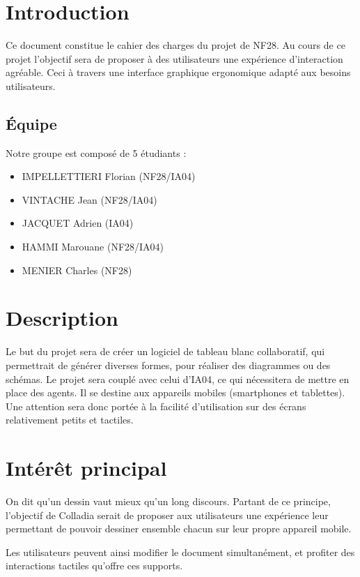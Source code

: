 \documentclass[a4paper,11pt]{article}
\begin{document}


\newpage
\section{Introduction}
Ce document constitue le cahier des charges du projet de NF28. Au cours de ce projet l'objectif sera de proposer à des utilisateurs une expérience d'interaction agréable. Ceci à travers une interface graphique ergonomique adapté aux besoins utilisateurs.

\subsection{Équipe}
Notre groupe est composé de 5 étudiants :
\begin{itemize}
\item IMPELLETTIERI Florian (NF28/IA04)
\item VINTACHE Jean (NF28/IA04)
\item JACQUET Adrien (IA04)
\item HAMMI Marouane (NF28/IA04)
\item MENIER Charles (NF28)
\end{itemize}



\section{Description}
Le but du projet sera de créer un logiciel de tableau blanc collaboratif, qui permettrait de générer diverses formes, pour réaliser des diagrammes ou des schémas.
Le projet sera couplé avec celui d'IA04, ce qui nécessitera de mettre en place des agents. Il se destine aux appareils mobiles (smartphones et tablettes). Une attention sera donc portée à la facilité d’utilisation sur des écrans relativement petits et tactiles.



\section{Intérêt principal}
On dit qu’un dessin vaut mieux qu’un long discours. Partant de ce principe, l’objectif de Colladia serait de proposer aux utilisateurs une expérience leur permettant de pouvoir dessiner ensemble chacun sur leur propre appareil mobile. 

Les utilisateurs peuvent ainsi modifier le document simultanément, et profiter des interactions tactiles qu’offre ces supports.
\end{document}
